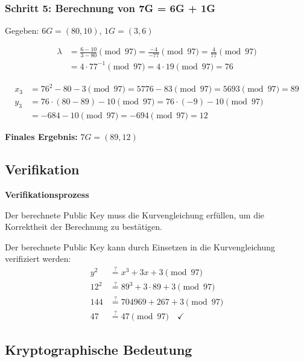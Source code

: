 \documentclass{article}
\begin{document}
\subsubsection{Schritt 5: Berechnung von 7G = 6G + 1G}
Gegeben: $6G = (80, 10)$, $1G = (3, 6)$

\begin{align}
\lambda &= \frac{6 - 10}{3 - 80} \pmod{97} = \frac{-4}{-77} \pmod{97} = \frac{4}{77} \pmod{97} \\
&= 4 \cdot 77^{-1} \pmod{97} = 4 \cdot 19 \pmod{97} = 76
\end{align}

\begin{align}
x_3 &= 76^2 - 80 - 3 \pmod{97} = 5776 - 83 \pmod{97} = 5693 \pmod{97} = 89 \\
y_3 &= 76 \cdot (80 - 89) - 10 \pmod{97} = 76 \cdot (-9) - 10 \pmod{97} \\
&= -684 - 10 \pmod{97} = -694 \pmod{97} = 12
\end{align}

\begin{solutionbox}
\textbf{Finales Ergebnis:} $7G = (89, 12)$
\end{solutionbox}

\subsection{Verifikation}

\begin{infobox}
\textbf{Verifikationsprozess}

Der berechnete Public Key muss die Kurvengleichung erfüllen, um die Korrektheit der Berechnung zu bestätigen.
\end{infobox}

Der berechnete Public Key kann durch Einsetzen in die Kurvengleichung verifiziert werden:
\begin{align}
y^2 &\stackrel{?}{=} x^3 + 3x + 3 \pmod{97} \\
12^2 &\stackrel{?}{=} 89^3 + 3 \cdot 89 + 3 \pmod{97} \\
144 &\stackrel{?}{=} 704969 + 267 + 3 \pmod{97} \\
47 &\stackrel{?}{=} 47 \pmod{97} \quad \checkmark
\end{align}

\subsection{Kryptographische Bedeutung}
\end{document}

